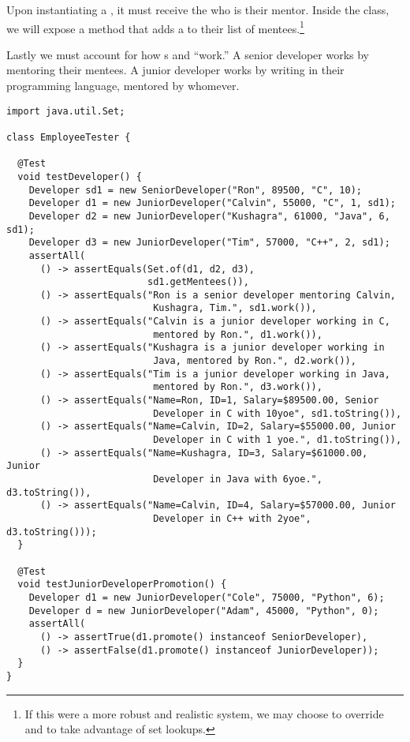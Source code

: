 Upon instantiating a , it must receive the  who is their mentor. 
Inside the  class, we will expose a method that adds a  to their list of mentees.\footnote{If this were a more robust and realistic system, we may choose to override  and  to take advantage of set lookups.}

Lastly we must account for how s and  ``work.'' 
A senior developer works by mentoring their mentees. 
A junior developer works by writing in their programming language, mentored by whomever.

\begin{lstlisting}[language=MyJava]
import java.util.Set;

class EmployeeTester {
   
  @Test
  void testDeveloper() {
    Developer sd1 = new SeniorDeveloper("Ron", 89500, "C", 10);
    Developer d1 = new JuniorDeveloper("Calvin", 55000, "C", 1, sd1);
    Developer d2 = new JuniorDeveloper("Kushagra", 61000, "Java", 6, sd1);
    Developer d3 = new JuniorDeveloper("Tim", 57000, "C++", 2, sd1);
    assertAll(
      () -> assertEquals(Set.of(d1, d2, d3), 
                         sd1.getMentees()),
      () -> assertEquals("Ron is a senior developer mentoring Calvin, 
                          Kushagra, Tim.", sd1.work()),
      () -> assertEquals("Calvin is a junior developer working in C, 
                          mentored by Ron.", d1.work()),
      () -> assertEquals("Kushagra is a junior developer working in 
                          Java, mentored by Ron.", d2.work()),
      () -> assertEquals("Tim is a junior developer working in Java, 
                          mentored by Ron.", d3.work()),
      () -> assertEquals("Name=Ron, ID=1, Salary=$89500.00, Senior 
                          Developer in C with 10yoe", sd1.toString()),
      () -> assertEquals("Name=Calvin, ID=2, Salary=$55000.00, Junior 
                          Developer in C with 1 yoe.", d1.toString()),
      () -> assertEquals("Name=Kushagra, ID=3, Salary=$61000.00, Junior 
                          Developer in Java with 6yoe.", d3.toString()),
      () -> assertEquals("Name=Calvin, ID=4, Salary=$57000.00, Junior 
                          Developer in C++ with 2yoe", d3.toString()));
  }

  @Test
  void testJuniorDeveloperPromotion() {
    Developer d1 = new JuniorDeveloper("Cole", 75000, "Python", 6);
    Developer d = new JuniorDeveloper("Adam", 45000, "Python", 0);
    assertAll(
      () -> assertTrue(d1.promote() instanceof SeniorDeveloper),
      () -> assertFalse(d1.promote() instanceof JuniorDeveloper));
  }
}
\end{lstlisting}

